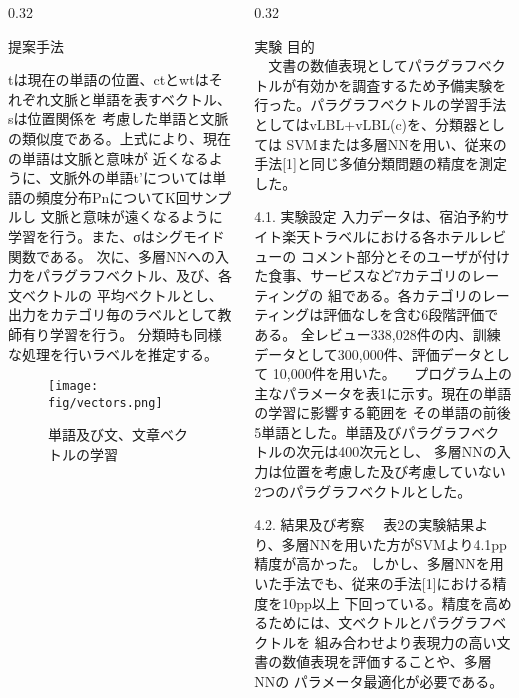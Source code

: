 \documentclass[10pt,unicode]{beamer}
\newcommand{\columnsize}{0.32}
\begin{document}
\begin{frame}{}
\begin{columns}[t]
\begin{column}{\columnsize\textwidth}
\begin{block}{提案手法}

    tは現在の単語の位置、ctとwtはそれぞれ文脈と単語を表すベクトル、sは位置関係を
    考慮した単語と文脈の類似度である。上式により、現在の単語は文脈と意味が
    近くなるように、文脈外の単語t'については単語の頻度分布PnについてK回サンプルし
    文脈と意味が遠くなるように学習を行う。また、σはシグモイド関数である。
    次に、多層NNへの入力をパラグラフベクトル、及び、各文ベクトルの
    平均ベクトルとし、出力をカテゴリ毎のラベルとして教師有り学習を行う。
    分類時も同様な処理を行いラベルを推定する。

    \begin{figure}
      \texttt{[image: fig/vectors.png]}
      \caption{単語及び文、文章ベクトルの学習}
    \end{figure}
  \end{block}
\end{column} %

\begin{column}{\columnsize\textwidth} %
  \begin{block}{実験}
    目的 \\
    　文書の数値表現としてパラグラフベクトルが有効かを調査するため予備実験を
    行った。パラグラフベクトルの学習手法としてはvLBL+vLBL(c)を、分類器としては
    SVMまたは多層NNを用い、従来の手法[1]と同じ多値分類問題の精度を測定した。

    4.1. 実験設定
    入力データは、宿泊予約サイト楽天トラベルにおける各ホテルレビューの
    コメント部分とそのユーザが付けた食事、サービスなど7カテゴリのレーティングの
    組である。各カテゴリのレーティングは評価なしを含む6段階評価である。
    全レビュー338,028件の内、訓練データとして300,000件、評価データとして
    10,000件を用いた。
    　プログラム上の主なパラメータを表1に示す。現在の単語の学習に影響する範囲を
    その単語の前後5単語とした。単語及びパラグラフベクトルの次元は400次元とし、
    多層NNの入力は位置を考慮した及び考慮していない2つのパラグラフベクトルとした。

    4.2. 結果及び考察
    　表2の実験結果より、多層NNを用いた方がSVMより4.1pp精度が高かった。
    しかし、多層NNを用いた手法でも、従来の手法[1]における精度を10pp以上
    下回っている。精度を高めるためには、文ベクトルとパラグラフベクトルを
    組み合わせより表現力の高い文書の数値表現を評価することや、多層NNの
    パラメータ最適化が必要である。


\end{block}
\end{column}
\end{columns}
\end{frame}
\end{document}

